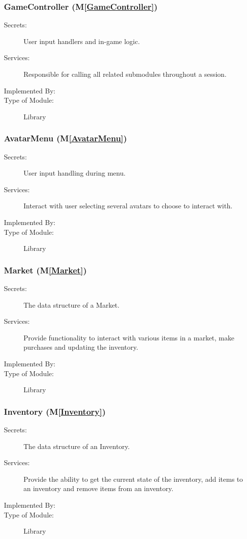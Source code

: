 \documentclass[12pt, titlepage]{article}
\newcommand{\mref}[1]{M\ref{#1}}
\begin{document}
\subsubsection{GameController (\mref{GameController})}

\begin{description}
\item[Secrets:] User input handlers and in-game logic.
\item[Services:] Responsible for calling all related submodules throughout a session.
\item[Implemented By:]  \progname
\item[Type of Module:] Library
\end{description}

\subsubsection{AvatarMenu (\mref{AvatarMenu})}

\begin{description}
\item[Secrets:] User input handling during menu.
\item[Services:] Interact with user selecting several avatars to choose to interact with.
\item[Implemented By:]  \progname
\item[Type of Module:] Library
\end{description}


\subsubsection{Market (\mref{Market})}

\begin{description}
\item[Secrets:] The data structure of a Market.
\item[Services:] Provide functionality to interact with various items in a market, make purchases and updating the inventory.
\item[Implemented By:]  \progname
\item[Type of Module:] Library
\end{description}

\subsubsection{Inventory (\mref{Inventory})}

\begin{description}
\item[Secrets:] The data structure of an Inventory.
\item[Services:] Provide the ability to get the current state of the inventory, add items to an inventory and remove items from an inventory.

\item[Implemented By:]  \progname
\item[Type of Module:] Library
\end{description}
\end{document}
